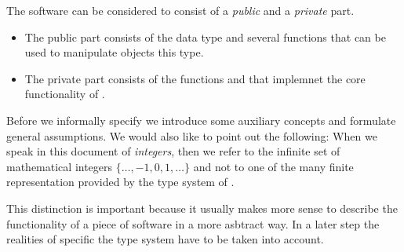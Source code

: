 The \bitwalker software can be considered to consist of a \emph{public}
and a \emph{private} part.
\begin{itemize}
\item
The public part consists of the \isoc data type \bitwalkertype and several \isoc functions
that can be used to manipulate objects this type.

\item
The private part consists of the functions \peek and \poke
that implemnet the core functionality of \bitwalker.
\end{itemize}

Before we informally specify \bitwalker
we introduce some auxiliary concepts and formulate general assumptions.
We would also like to point out the following:
When we speak in this document of \emph{integers},
then we refer to the infinite set of mathematical
integers $\{\ldots, -1, 0, 1, \ldots\}$
and not to one of the many finite representation provided by the type system of \isoc.

This distinction is important because it usually makes more sense
to describe the functionality of a piece of software in a more
asbtract way.
In a later step the realities of specific the \isoc type system
have to be taken into account.


